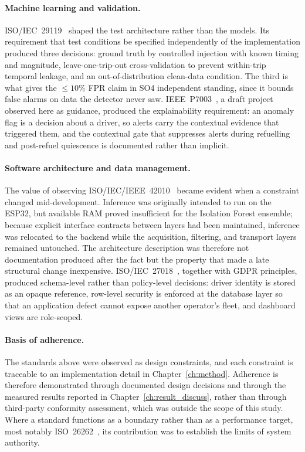 \paragraph{Machine learning and validation.} ISO/IEC~29119~\cite{iso29119} shaped the test architecture rather than the models. Its requirement that test conditions be specified independently of the implementation produced three decisions: ground truth by controlled injection with known timing and magnitude, leave-one-trip-out cross-validation to prevent within-trip temporal leakage, and an out-of-distribution clean-data condition. The third is what gives the $\leq 10\%$ FPR claim in SO4 independent standing, since it bounds false alarms on data the detector never saw. IEEE~P7003~\cite{ieeep7003}, a draft project observed here as guidance, produced the explainability requirement: an anomaly flag is a decision about a driver, so alerts carry the contextual evidence that triggered them, and the contextual gate that suppresses alerts during refuelling and post-refuel quiescence is documented rather than implicit.

\paragraph{Software architecture and data management.} The value of observing ISO/IEC/IEEE~42010~\cite{iso42010} became evident when a constraint changed mid-development. Inference was originally intended to run on the ESP32, but available RAM proved insufficient for the Isolation Forest ensemble; because explicit interface contracts between layers had been maintained, inference was relocated to the backend while the acquisition, filtering, and transport layers remained untouched. The architecture description was therefore not documentation produced after the fact but the property that made a late structural change inexpensive. ISO/IEC~27018~\cite{iso27018}, together with GDPR principles, produced schema-level rather than policy-level decisions: driver identity is stored as an opaque reference, row-level security is enforced at the database layer so that an application defect cannot expose another operator's fleet, and dashboard views are role-scoped.

\paragraph{Basis of adherence.} The standards above were observed as design constraints, and each constraint is traceable to an implementation detail in Chapter~\ref{ch:method}. Adherence is therefore demonstrated through documented design decisions and through the measured results reported in Chapter~\ref{ch:result_discuss}, rather than through third-party conformity assessment, which was outside the scope of this study. Where a standard functions as a boundary rather than as a performance target, most notably ISO~26262~\cite{iso26262}, its contribution was to establish the limits of system authority.

